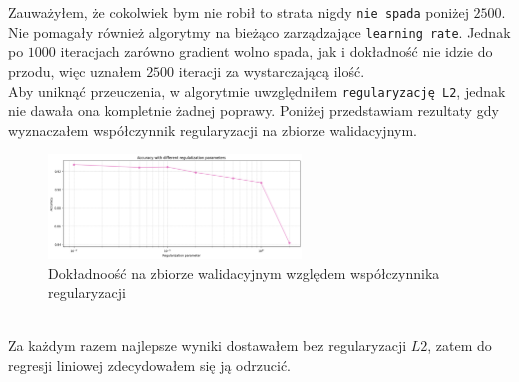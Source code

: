 \documentclass[polish,12pt,a4paper]{extarticle}
\begin{document}
Zauważyłem, że cokolwiek bym nie robił to strata nigdy \texttt{nie spada} poniżej $2500$. Nie pomagały również algorytmy na bieżąco zarządzające \texttt{learning rate}. Jednak po $1000$ iteracjach zarówno gradient wolno spada, jak i dokładność nie idzie do przodu, więc uznałem $2500$ iteracji za wystarczającą ilość. \smallskip \\
Aby uniknąć przeuczenia, w algorytmie uwzględniłem \texttt{regularyzację L2}, jednak nie dawała ona kompletnie żadnej poprawy. Poniżej przedstawiam rezultaty gdy wyznaczałem współczynnik regularyzacji na zbiorze walidacyjnym. \\
\begin{figure}[h!]
    \centering
    \includegraphics[width=0.60\textwidth]{img/reg_accuracy.png}
    \caption{Dokładnoość na zbiorze walidacyjnym względem współczynnika regularyzacji}
\end{figure} \FloatBarrier \\
Za każdym razem najlepsze wyniki dostawałem bez regularyzacji $L2$, zatem do regresji liniowej zdecydowałem się ją odrzucić.
\end{document}
